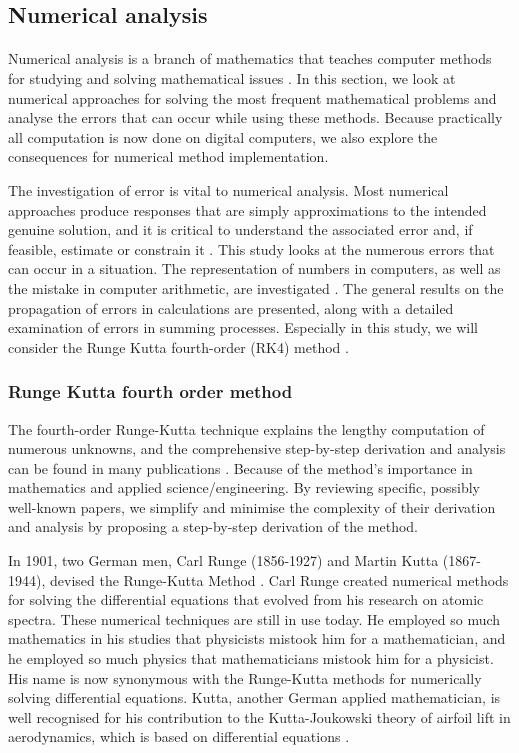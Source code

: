 \subsection{Numerical analysis}
\label{Num}

\paragraph{}
Numerical analysis is a branch of mathematics that teaches computer methods for studying and solving mathematical issues \cite{burden2015numerical}. In this section, we look at numerical approaches for solving the most frequent mathematical problems and analyse the errors that can occur while using these methods. Because practically all computation is now done on digital computers, we also explore the consequences for numerical method implementation.

The investigation of error is vital to numerical analysis. Most numerical approaches produce responses that are simply approximations to the intended genuine solution, and it is critical to understand the associated error and, if feasible, estimate or constrain it \cite{heydari2016theoretical}. This study looks at the numerous errors that can occur in a situation. The representation of numbers in computers, as well as the mistake in computer arithmetic, are investigated \cite{cui2018numerical}. The general results on the propagation of errors in calculations are presented, along with a detailed examination of errors in summing processes. Especially in this study, we will consider the Runge Kutta fourth-order (RK4) method \cite{islam2015accurate}. 

\subsubsection{Runge Kutta fourth order method}
\label{RK}
The fourth-order Runge-Kutta technique explains the lengthy computation of numerous unknowns, and the comprehensive step-by-step derivation and analysis can be found in many publications \cite{tan2012general} \cite{mehdi2017using}. Because of the method's importance in mathematics and applied science/engineering. By reviewing specific, possibly well-known papers, we simplify and minimise the complexity of their derivation and analysis by proposing a step-by-step derivation of the method.

In 1901, two German men, Carl Runge (1856-1927) and Martin Kutta (1867-1944), devised the Runge-Kutta Method \cite{tobies2012iris}. Carl Runge created numerical methods for solving the differential equations that evolved from his research on atomic spectra. These numerical techniques are still in use today. He employed so much mathematics in his studies that physicists mistook him for a mathematician, and he employed so much physics that mathematicians mistook him for a physicist. His name is now synonymous with the Runge-Kutta methods for numerically solving differential equations. Kutta, another German applied mathematician, is well recognised for his contribution to the Kutta-Joukowski theory of airfoil lift in aerodynamics, which is based on differential equations \cite{trefethen2015invented}. 

